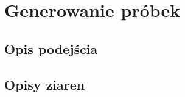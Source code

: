 \chapter{Generowanie próbek} 
{

    \section{Opis podejścia}
    {

    }

    \section{Opisy ziaren}
    {
        
    }
}